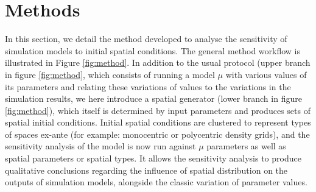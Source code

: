 \documentclass[Afour,sageh,times]{sagej}
\begin{document}

\section{Methods}

In this section, we detail the method developed to analyse the sensitivity of simulation models to initial spatial conditions. The general method workflow is illustrated in Figure \ref{fig:method}. In addition to the usual protocol (upper branch in figure \ref{fig:method}, which consists of running a model $\mu$ with various values of its parameters and relating these variations of values to the variations in the simulation results, we here introduce a spatial generator (lower branch in figure \ref{fig:method}), which itself is determined by input parameters and produces sets of spatial initial conditions. Initial spatial conditions are clustered to represent types of spaces ex-ante (for example: monocentric or polycentric density grids), and the sensitivity analysis of the model is now run against $\mu$ parameters as well as spatial parameters or spatial types. It allows the sensitivity analysis to produce qualitative conclusions regarding the influence of spatial distribution on the outputs of simulation models, alongside the classic variation of parameter values.
\end{document}
